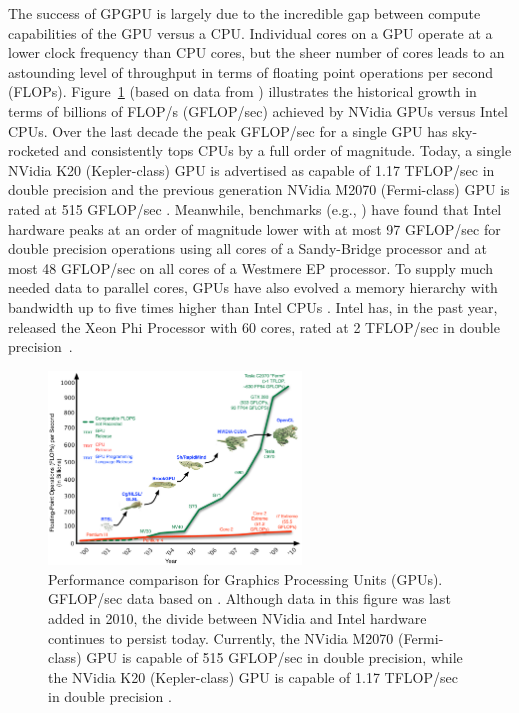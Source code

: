 \documentclass{report}
\begin{document}
The success of GPGPU is largely due to the incredible gap between compute capabilities of the GPU versus a CPU. Individual cores on a GPU operate at a lower clock frequency than CPU cores, but the sheer number of cores leads to an astounding level of throughput in terms of floating point operations per second (FLOPs). Figure~\ref{fig:floating-point-operations-per-second} (based on data from \cite{Behr2009, OpenCL2009}) illustrates the historical growth in terms of billions of FLOP/s (GFLOP/sec) achieved by NVidia GPUs versus Intel CPUs. Over the last decade the peak GFLOP/sec for a single GPU has sky-rocketed and consistently tops CPUs by a full order of magnitude. Today, a single NVidia K20 (Kepler-class) GPU is advertised as capable of 1.17 TFLOP/sec in double precision \cite{KeplerFactSheet} and the previous generation NVidia M2070 (Fermi-class) GPU is rated at 515 GFLOP/sec \cite{Fermi2009}. Meanwhile, benchmarks (e.g., \cite{Vladimirov2012}) have found that Intel hardware peaks at an order of magnitude lower with at most 97 GFLOP/sec for double precision operations using all cores of a Sandy-Bridge processor and at most 48 GFLOP/sec on all cores of a Westmere EP processor. To supply much needed data to parallel cores, GPUs have also evolved a memory hierarchy with bandwidth up to five times higher than Intel CPUs \cite{CudaGuide2013}. Intel has, in the past year, released the Xeon Phi Processor with 60 cores, rated at 2 TFLOP/sec in double precision~\cite{IntelXeonPhi2013}.

\begin{figure}
\centering
\includegraphics[width=0.6\textwidth]{../figures/prospectus/GPU_Evolution_opencl.pdf}
\caption{Performance comparison for Graphics Processing Units (GPUs). GFLOP/sec data based on \cite{Behr2009, OpenCL2009}. Although data in this figure was last added in 2010, the divide between NVidia and Intel hardware continues to persist today. Currently, the NVidia M2070 (Fermi-class) GPU is capable of 515 GFLOP/sec in double precision, while the NVidia K20 (Kepler-class) GPU is capable of 1.17 TFLOP/sec in double precision \cite{CudaGuide2013}.}
\label{fig:floating-point-operations-per-second}
\end{figure}
\end{document}

